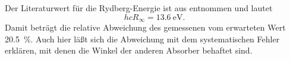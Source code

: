 Der Literaturwert für die Rydberg-Energie ist aus
\textcite{codata:rydhcev} entnommen und lautet
%
\begin{equation}
  h c R_\infty = \SI{13.6}{\electronvolt}.
\end{equation}
%
Damit beträgt die relative Abweichung des gemessenen vom erwarteten Wert
\SI{20.5}{\percent}. Auch hier läßt sich die Abweichung mit dem
systematischen Fehler erklären, mit denen die Winkel der anderen
Absorber behaftet sind.

